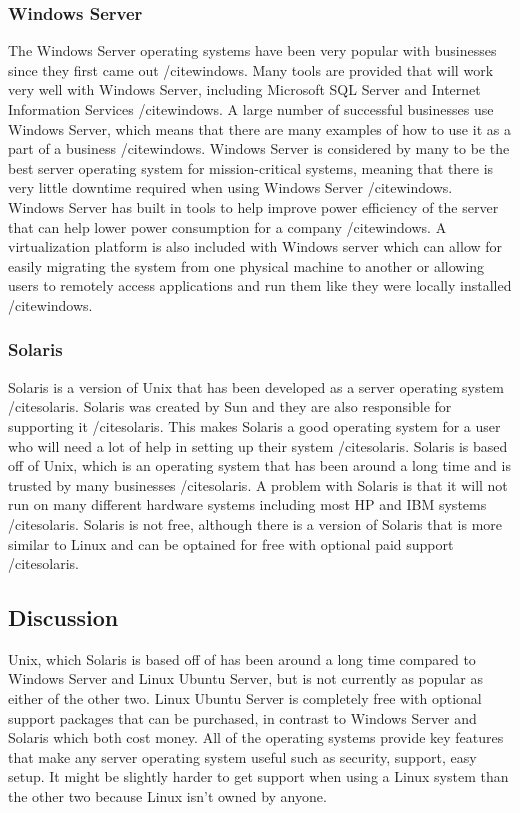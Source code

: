 \documentclass[onecolumn, draftclsnofoot,10pt, compsoc]{IEEEtran}
\begin{document}
\subsubsection{Windows Server}
The Windows Server operating systems have been very popular with businesses since they first came out /cite{windows}. Many tools are provided that will work very well with Windows Server, including Microsoft SQL Server and Internet Information Services /cite{windows}. A large number of successful businesses use Windows Server, which means that there are many examples of how to use it as a part of a business /cite{windows}. Windows Server is considered by many to be the best server operating system for mission-critical systems, meaning that there is very little downtime required when using Windows Server /cite{windows}. Windows Server has built in tools to help improve power efficiency of the server that can help lower power consumption for a company /cite{windows}. A virtualization platform is also included with Windows server which can allow for easily migrating the system from one physical machine to another or allowing users to remotely access applications and run them like they were locally installed /cite{windows}.

\subsubsection{Solaris}
Solaris is a version of Unix that has been developed as a server operating system /cite{solaris}. Solaris was created by Sun and they are also responsible for supporting it /cite{solaris}. This makes Solaris a good operating system for a user who will need a lot of help in setting up their system /cite{solaris}. Solaris is based off of Unix, which is an operating system that has been around a long time and is trusted by many businesses /cite{solaris}. A problem with Solaris is that it will not run on many different hardware systems including most HP and IBM systems /cite{solaris}. Solaris is not free, although there is a version of Solaris that is more similar to Linux and can be optained for free with optional paid support /cite{solaris}.

\subsection{Discussion}
Unix, which Solaris is based off of has been around a long time compared to Windows Server and Linux Ubuntu Server, but is not currently as popular as either of the other two. Linux Ubuntu Server is completely free with optional support packages that can be purchased, in contrast to Windows Server and Solaris which both cost money. All of the operating systems provide key features that make any server operating system useful such as security, support, easy setup. It might be slightly harder to get support when using a Linux system than the other two because Linux isn't owned by anyone.
\end{document}

